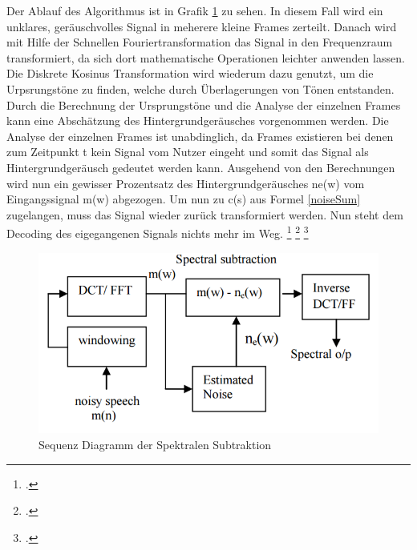 
Der Ablauf des Algorithmus ist in Grafik \ref{figspecSub} zu sehen. 
In diesem Fall wird ein unklares, geräuschvolles Signal in meherere kleine Frames zerteilt. Danach wird mit Hilfe der Schnellen Fouriertransformation das Signal in den Frequenzraum transformiert, da sich dort mathematische Operationen leichter anwenden lassen. Die Diskrete Kosinus Transformation wird wiederum dazu genutzt, um die Urpsrungstöne zu finden, welche durch Überlagerungen von Tönen entstanden. Durch die Berechnung der Ursprungstöne und die Analyse der einzelnen Frames kann eine Abschätzung des Hintergrundgeräusches vorgenommen werden. Die Analyse der einzelnen Frames ist unabdinglich, da Frames existieren bei denen zum Zeitpunkt t kein Signal vom Nutzer eingeht und somit das Signal als Hintergrundgeräusch gedeutet werden kann.
Ausgehend von den Berechnungen wird nun ein gewisser Prozentsatz des Hintergrundgeräusches ne(w) vom Eingangssignal m(w) abgezogen. Um nun zu c(s) aus Formel \ref{noiseSum} zugelangen, muss das Signal wieder zurück transformiert werden. Nun steht dem Decoding des eigegangenen Signals nichts mehr im Weg.
\footcite[vlg.:][S. 2 f.]{specSub}
\footcite[vlg.:][]{fft}
\footcite[vlg.:][]{dct}

\begin{figure}[h]
	\centering
  \includegraphics[scale=0.7]{images/spectral_sub.png}
	\caption{Sequenz Diagramm der Spektralen Subtraktion}
	\label{figspecSub}
\end{figure}

